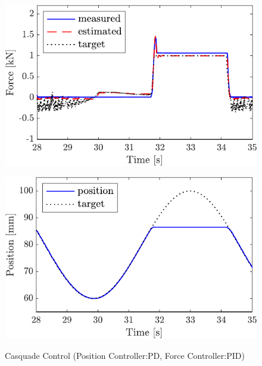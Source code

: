 \begin{figure}[t]
    \begin{minipage}{\minipageratio\hsize}
    \centering
        \includegraphics[keepaspectratio, scale = \minifigscale]{contents/IntegrationControl/figure/SECASQ/crop-FBcsqtch_PID_Notrq_posPIDadjust_force.pdf}
        \label{fig5:crop-FBcsqtch_PID_Notrq_posPIDadjust_force}
    \end{minipage}
    \begin{minipage}{\minipageratio\hsize}
    \centering
        \includegraphics[keepaspectratio, scale = \minifigscale]{contents/IntegrationControl/figure/SECASQ/crop-FBcsqtch_PID_Notrq_posPIDadjust_pos.pdf}
        \label{fig5:crop-FBcsqtch_PID_Notrq_posPIDadjust_pos}
    \end{minipage}
    \caption{Casquade Control (Position Controller:PD, Force Controller:PID)}  
    \label{fig5:crop-FBcsqtch_PID_Notrq_posPIDadjust}
\end{figure}


